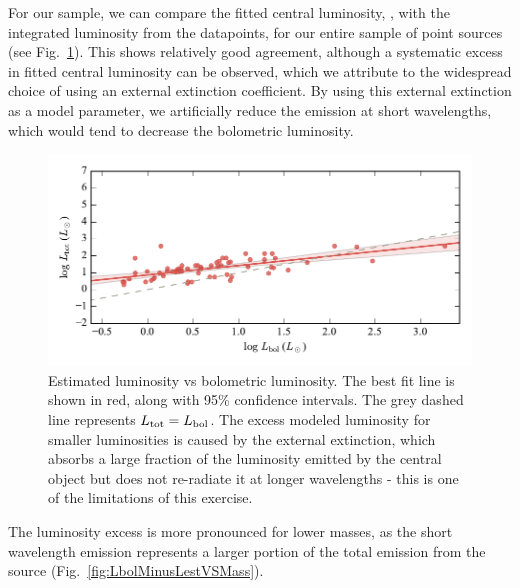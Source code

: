 For our sample, we can compare the fitted central luminosity, \Ltot, with the integrated luminosity from the datapoints, \Lbol for our entire sample of point sources (see Fig.~\ref{fig:LbolVsLest}). This shows relatively good agreement, although a systematic excess in fitted central luminosity can be observed, which we attribute to the widespread choice of using an external extinction coefficient. By using this external extinction as a model parameter, we artificially reduce the emission at short wavelengths, which would tend to decrease the bolometric luminosity.
\begin{figure}[!h]
\begin{center}
\includegraphics[width=\textwidth]{Figures/LbolVsLest.pdf}
\vspace{-1cm}
\caption[Estimated luminosity vs bolometric luminosity]{Estimated luminosity vs bolometric luminosity. The best fit line is shown in red, along with 95\% confidence intervals. The grey dashed line represents $L_\textrm{tot} = L_\textrm{bol}$. The excess modeled luminosity for smaller luminosities is caused by the external extinction, which absorbs a large fraction of the luminosity emitted by the central object but does not re-radiate it at longer wavelengths - this is one of the limitations of this exercise.}
\label{fig:LbolVsLest}
\end{center}
\end{figure}

The luminosity excess is more pronounced for lower masses, as the short wavelength emission represents a larger portion of the total emission from the source (Fig.~\ref{fig:LbolMinusLestVSMass}). 

